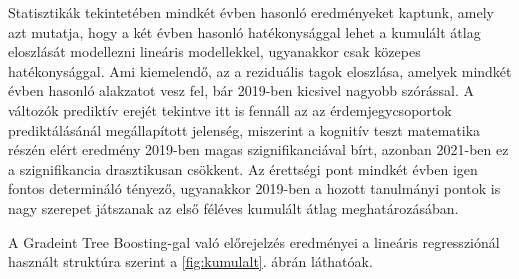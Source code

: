 \documentclass[12pt]{article}
\begin{document}
\noindent Statisztikák tekintetében mindkét évben hasonló eredményeket kaptunk, amely azt mutatja, hogy a két évben hasonló hatékonysággal lehet a kumulált átlag eloszlását modellezni lineáris modellekkel, ugyanakkor csak közepes hatékonysággal. Ami kiemelendő, az a reziduális tagok eloszlása, amelyek mindkét évben hasonló alakzatot vesz fel, bár 2019-ben kicsivel nagyobb szórással. A változók prediktív erejét tekintve itt is fennáll az az érdemjegycsoportok prediktálásánál megállapított jelenség, miszerint a kognitív teszt matematika részén elért eredmény 2019-ben magas szignifikanciával bírt, azonban 2021-ben ez a szignifikancia drasztikusan csökkent. Az érettségi pont mindkét évben igen fontos determináló tényező, ugyanakkor 2019-ben a hozott tanulmányi pontok is nagy szerepet játszanak az első féléves kumulált átlag meghatározásában.

A Gradeint Tree Boosting-gal való előrejelzés eredményei a lineáris regressziónál használt struktúra szerint a \ref{fig:kumulalt}. ábrán láthatóak. 
\end{document}
